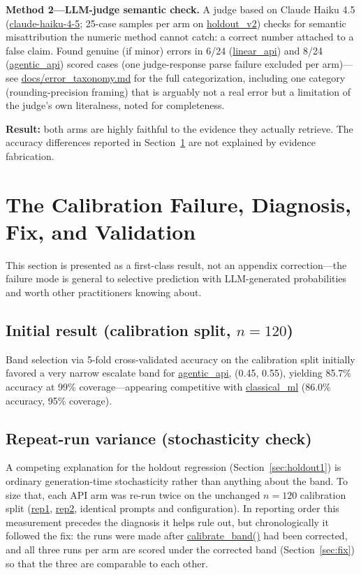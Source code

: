 \documentclass[]{ieeeaccess}
\newcommand{\code}[1]{\url{#1}}
\begin{document}
\textbf{Method 2---LLM-judge semantic check.} A judge based on Claude
Haiku 4.5 (\code{claude-haiku-4-5}; 25-case samples per arm on \code{holdout_v2}) checks for semantic
misattribution the numeric method cannot catch: a correct number attached
to a false claim. Found genuine (if minor) errors in 6/24
(\code{linear_api}) and 8/24 (\code{agentic_api}) scored cases (one
judge-response parse failure excluded per arm)---see
\code{docs/error_taxonomy.md} for the full categorization, including one
category (rounding-precision framing) that is arguably not a real error
but a limitation of the judge's own literalness, noted for
completeness.

\textbf{Result:} both arms are highly faithful to the evidence they
actually retrieve. The accuracy differences reported in Section~\ref{sec:calib} are
not explained by evidence fabrication.

\section{The Calibration Failure, Diagnosis, Fix, and Validation}\label{sec:calib}

This section is presented as a first-class result, not an appendix
correction---the failure mode is general to selective prediction with
LLM-generated probabilities and worth other practitioners knowing about.

\subsection{Initial result (calibration split, \texorpdfstring{$n=120$}{n=120})}\label{sec:initial}

Band selection via 5-fold cross-validated accuracy on the calibration
split initially favored a very narrow escalate band for
\code{agentic_api}, (0.45, 0.55), yielding 85.7\% accuracy at 99\%
coverage---appearing competitive with \code{classical_ml} (86.0\%
accuracy, 95\% coverage).

\subsection{Repeat-run variance (stochasticity check)}\label{sec:variance}

A competing explanation for the holdout regression
(Section~\ref{sec:holdout1}) is ordinary generation-time stochasticity
rather than anything about the band. To size that, each API arm was
re-run twice on the unchanged $n=120$ calibration split (\code{rep1},
\code{rep2}, identical prompts and configuration). In reporting order
this measurement precedes the diagnosis it helps rule out, but
chronologically it followed the fix: the runs were made after
\code{calibrate_band()} had been corrected, and all three runs per arm
are scored under the corrected band (Section~\ref{sec:fix}) so that the
three are comparable to each other.
\end{document}
